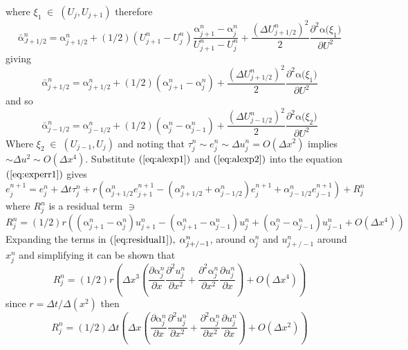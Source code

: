 \documentclass[11pt]{article}
\newcommand{\pl}{\partial}
\newcommand{\D}{\Delta}
\newcommand{\al}{\mathrm{\alpha}}
\begin{document}
where $\xi_1\; \in\; (U_j,U_{j+1}) $ therefore
\begin{equation*}
\bar{\al}_{J+1/2}^n =   \al_{j+1/2}^n+ (1/2)(U_{j+1}^n-U_j^n)\frac{\al_{j+1}^n-\al_j^n } {U_{j+1}^n-U_j^n } + 
  \frac{(\D{U_{j+1/2}^n})^2}{2}\frac{ \pl^2{\al(\xi }_1 )} { \pl{U}^2 } 
\end{equation*}
giving
\begin{equation}
\label{eq:alexp1}
\bar{\al}_{j+1/2}^n = \al_{j+1/2}^n+ (1/2)(\al_{j+1}^n-\al_j^n ) +   \frac{(\D{U_{j+1/2}^n})^2}{2}\frac{ \pl^2{\al(\xi }_1 )} { \pl{U}^2 }
\end{equation}
and so
\begin{equation}
\label{eq:alexp2}
\bar{\al}_{j-1/2}^n   = \al_{j-1/2}^n+ (1/2)(\al_{j}^n-\al_{j-1}^n )  +  \frac{(\D{U_{j-1/2}^n})^2}{2}\frac{ \pl^2{\al(\xi }_2 )} { \pl{U}^2 }
\end{equation}
Where $\xi_2\; \in\; (U_{j-1},U_j) $ and noting that $\tau_j^n \sim e_j^n \sim \D{u_j^n} =O( \D{x^2}) $ implies $\sim \D{u}^2 \sim O(\D{x}^4)$.
Substitute $(\ref{eq:alexp1})$ and $(\ref{eq:alexp2})$ into the equation $(\ref{eq:experr1})$ gives
\begin{equation}
\label{eq:experr2}
e_j^{n+1} = e_j^n + \D{t}\tau_j^n +  r(\alpha_{j+1/2}^ne_{j+1}^{n+1} - (\alpha_{j+1/2}^n+\alpha_{j-1/2}^n)e_j^{n+1}+\alpha_{j-1/2}^ne_{j-1}^{n+1}) + R_j^n
\end{equation}
where $R_j^n$ is a residual term $\ni$ 
\begin{equation} 
\label{eq:residual1}
R_j^n = (1/2)r\left(  (\al_{j+1}^n-\al_j^n)u_{j+1}^n-( \al_{j+1}^n-\al_{j-1}^n)u_j^n  + (\al_j^n-\al_{j-1}^n)u_{j-1}^n     + O(\D{x^4}) \right)  
\end{equation}
Expanding the terms in $(\ref{eq:residual1}), \;\al_{j+/-1}^n$, around $\al_j^n$ and $u_{j+/-1}^n$ around $x_j^n$ and simplifying it can be shown that
\begin{equation} 
R_j^n = (1/2)r\left(\D{x^3}\left(   \frac{ \pl{\al_j^n} }{ \pl{x }} \frac{ \pl^2{u_j^n} }{ \pl{x^2 }} +  \frac{  \pl^2{\al_j^n}  }{ \pl{x^2 } }   \frac{ \pl{u_j^n} }{ \pl{x}}  \right )    + O(\D{x^4}  )\right) 
\end{equation}  
since $r=\D{t}/\D(x^2)$ then
\begin{equation} 
\label{eq:residual2}
 R_j^n = (1/2)\D{t}\left(\D{x}\left(   \frac{ \pl{\al_j^n} }{ \pl{x }} \frac{ \pl^2{u_j^n} }{ \pl{x^2 }} +  \frac{  \pl^2{\al_j^n}  }{ \pl{x^2 } }   \frac{ \pl{u_j^n} }{ \pl{x}}  \right )    + O(\D{x^2}  )\right) 
\end{equation} 
\end{document}
